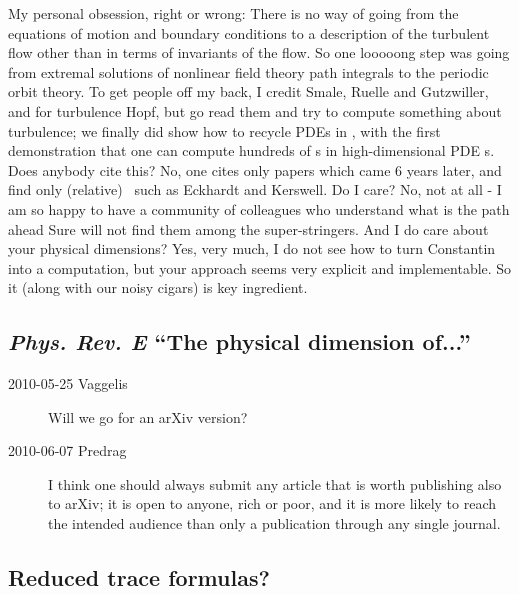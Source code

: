 \begin{description}
My personal obsession, right or wrong: There is no way of going from the
equations of motion and boundary conditions to a description of the
turbulent flow other than in terms of invariants of the flow. So one
looooong step was going from extremal solutions of nonlinear field theory
path integrals to the periodic orbit theory. To get people off my back, I
credit Smale, Ruelle and Gutzwiller, and
for turbulence Hopf, but go read them and try to compute
something about turbulence; we finally did show how to recycle PDEs in
, with the first demonstration that one can
compute hundreds of \po s in high-dimensional PDE \statesp s. Does
anybody cite this? No, one cites only papers which came 6 years later,
and find only (relative) \eqva\, such as Eckhardt and
Kerswell. Do I care? No, not at all - I am so happy to have a
community of colleagues who understand what is the path ahead Sure will
not find them among the super-stringers. And I do care about your
physical dimensions? Yes, very much, I do not see how to turn
Constantin into a computation, but your
approach seems very explicit and implementable. So it (along with our
noisy cigars) is key ingredient.


\end{description}


\subsection{\emph{Phys. Rev. E} ``The physical dimension of...''}

\begin{description}

\item[2010-05-25 Vaggelis]
Will we go for an arXiv version?

\item[2010-06-07 Predrag]
I think one should always submit
any article that is worth publishing also to arXiv;
it is open to anyone, rich or poor, and it is
more likely to reach the intended audience than only a publication through
any single journal.

\end{description}

\subsection{Reduced trace formulas?}


